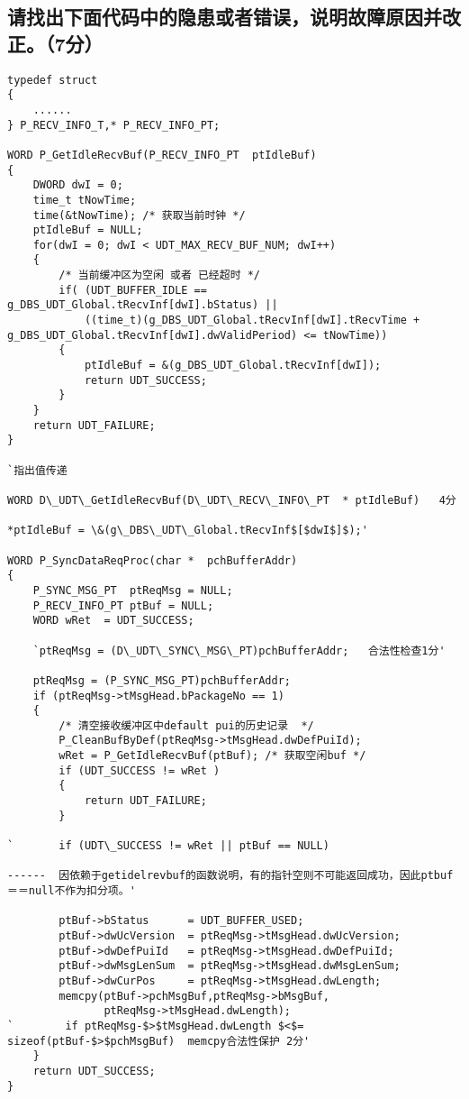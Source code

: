 ﻿\documentclass  [11pt,onecolumn,a4paper]{article}
\begin{document}
\subsection{请找出下面代码中的隐患或者错误，说明故障原因并改正。（7分）}
\begin{lstlisting}[escapeinside=`']
typedef struct
{
    ......
} P_RECV_INFO_T,* P_RECV_INFO_PT;

WORD P_GetIdleRecvBuf(P_RECV_INFO_PT  ptIdleBuf)
{
    DWORD dwI = 0;
    time_t tNowTime;
    time(&tNowTime); /* 获取当前时钟 */
    ptIdleBuf = NULL;
    for(dwI = 0; dwI < UDT_MAX_RECV_BUF_NUM; dwI++)
    {
        /* 当前缓冲区为空闲 或者 已经超时 */
        if( (UDT_BUFFER_IDLE == g_DBS_UDT_Global.tRecvInf[dwI].bStatus) ||
            ((time_t)(g_DBS_UDT_Global.tRecvInf[dwI].tRecvTime + g_DBS_UDT_Global.tRecvInf[dwI].dwValidPeriod) <= tNowTime))
        {
            ptIdleBuf = &(g_DBS_UDT_Global.tRecvInf[dwI]);
            return UDT_SUCCESS;
        }
    }
    return UDT_FAILURE;    
}

`指出值传递

WORD D\_UDT\_GetIdleRecvBuf(D\_UDT\_RECV\_INFO\_PT  * ptIdleBuf)   4分

*ptIdleBuf = \&(g\_DBS\_UDT\_Global.tRecvInf$[$dwI$]$);'

WORD P_SyncDataReqProc(char *  pchBufferAddr)
{
    P_SYNC_MSG_PT  ptReqMsg = NULL;
    P_RECV_INFO_PT ptBuf = NULL; 
    WORD wRet  = UDT_SUCCESS;
    
    `ptReqMsg = (D\_UDT\_SYNC\_MSG\_PT)pchBufferAddr;   合法性检查1分'
    
    ptReqMsg = (P_SYNC_MSG_PT)pchBufferAddr;
    if (ptReqMsg->tMsgHead.bPackageNo == 1)
    {
        /* 清空接收缓冲区中default pui的历史记录  */
        P_CleanBufByDef(ptReqMsg->tMsgHead.dwDefPuiId); 
        wRet = P_GetIdleRecvBuf(ptBuf); /* 获取空闲buf */
        if (UDT_SUCCESS != wRet )
        {
            return UDT_FAILURE;
        }

`       if (UDT\_SUCCESS != wRet || ptBuf == NULL)  

------  因依赖于getidelrevbuf的函数说明，有的指针空则不可能返回成功，因此ptbuf＝＝null不作为扣分项。'

        ptBuf->bStatus      = UDT_BUFFER_USED;
        ptBuf->dwUcVersion	= ptReqMsg->tMsgHead.dwUcVersion;
        ptBuf->dwDefPuiId   = ptReqMsg->tMsgHead.dwDefPuiId;
        ptBuf->dwMsgLenSum  = ptReqMsg->tMsgHead.dwMsgLenSum;
        ptBuf->dwCurPos     = ptReqMsg->tMsgHead.dwLength;
        memcpy(ptBuf->pchMsgBuf,ptReqMsg->bMsgBuf,
               ptReqMsg->tMsgHead.dwLength);  
`        if ptReqMsg-$>$tMsgHead.dwLength $<$= sizeof(ptBuf-$>$pchMsgBuf)  memcpy合法性保护 2分'
    }
    return UDT_SUCCESS;
}
\end{lstlisting}
\end{document}
